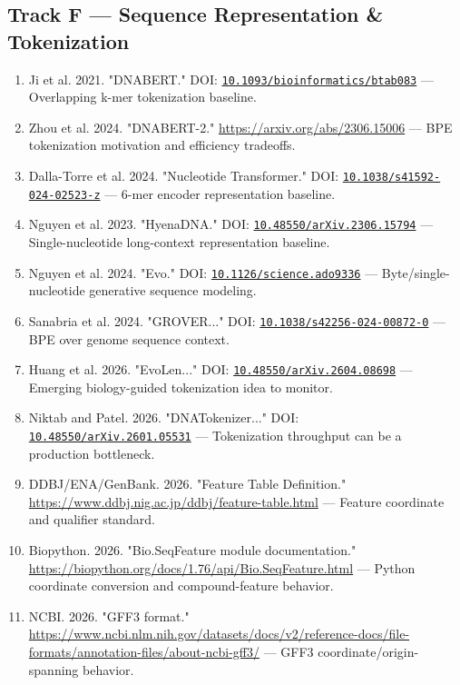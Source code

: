 \documentclass[11pt]{report}
\begin{document}
\subsection{Track F — Sequence Representation \& Tokenization}

\begin{enumerate}
\item Ji et al. 2021. "DNABERT." DOI: \href{https://doi.org/10.1093/bioinformatics/btab083}{\nolinkurl{10.1093/bioinformatics/btab083}} — Overlapping k-mer tokenization baseline.
\item Zhou et al. 2024. "DNABERT-2." \url{https://arxiv.org/abs/2306.15006} — BPE tokenization motivation and efficiency tradeoffs.
\item Dalla-Torre et al. 2024. "Nucleotide Transformer." DOI: \href{https://doi.org/10.1038/s41592-024-02523-z}{\nolinkurl{10.1038/s41592-024-02523-z}} — 6-mer encoder representation baseline.
\item Nguyen et al. 2023. "HyenaDNA." DOI: \href{https://doi.org/10.48550/arXiv.2306.15794}{\nolinkurl{10.48550/arXiv.2306.15794}} — Single-nucleotide long-context representation baseline.
\item Nguyen et al. 2024. "Evo." DOI: \href{https://doi.org/10.1126/science.ado9336}{\nolinkurl{10.1126/science.ado9336}} — Byte/single-nucleotide generative sequence modeling.
\item Sanabria et al. 2024. "GROVER..." DOI: \href{https://doi.org/10.1038/s42256-024-00872-0}{\nolinkurl{10.1038/s42256-024-00872-0}} — BPE over genome sequence context.
\item Huang et al. 2026. "EvoLen..." DOI: \href{https://doi.org/10.48550/arXiv.2604.08698}{\nolinkurl{10.48550/arXiv.2604.08698}} — Emerging biology-guided tokenization idea to monitor.
\item Niktab and Patel. 2026. "DNATokenizer..." DOI: \href{https://doi.org/10.48550/arXiv.2601.05531}{\nolinkurl{10.48550/arXiv.2601.05531}} — Tokenization throughput can be a production bottleneck.
\item DDBJ/ENA/GenBank. 2026. "Feature Table Definition." \url{https://www.ddbj.nig.ac.jp/ddbj/feature-table.html} — Feature coordinate and qualifier standard.
\item Biopython. 2026. "Bio.SeqFeature module documentation." \url{https://biopython.org/docs/1.76/api/Bio.SeqFeature.html} — Python coordinate conversion and compound-feature behavior.
\item NCBI. 2026. "GFF3 format." \url{https://www.ncbi.nlm.nih.gov/datasets/docs/v2/reference-docs/file-formats/annotation-files/about-ncbi-gff3/} — GFF3 coordinate/origin-spanning behavior.

\end{enumerate}
\end{document}
